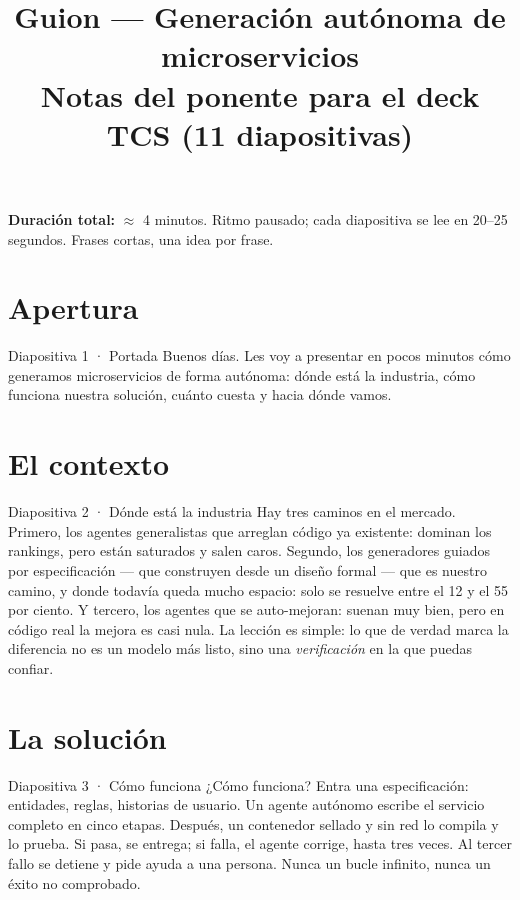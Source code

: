 \documentclass[11pt,a4paper]{article}
\title{\vspace{-1.2cm}\textbf{Guion — Generación autónoma de microservicios}\\[0.2cm]
\large Notas del ponente para el deck TCS (11 diapositivas)}
\author{}
\date{}
\begin{document}
\maketitle
\thispagestyle{fancy}

\begin{tcolorbox}[colback=bl!6,colframe=bl,arc=2pt,left=8pt,right=8pt,top=6pt,bottom=6pt]
\textbf{Duración total:} $\approx$ 4 minutos. Ritmo pausado; cada diapositiva se lee
en 20--25 segundos. Frases cortas, una idea por frase.
\end{tcolorbox}

\section*{Apertura}

\begin{slide}{Diapositiva 1 · Portada}
Buenos días. Les voy a presentar en pocos minutos cómo generamos microservicios de
forma autónoma: dónde está la industria, cómo funciona nuestra solución, cuánto
cuesta y hacia dónde vamos.
\end{slide}

\section*{El contexto}

\begin{slide}{Diapositiva 2 · Dónde está la industria}
Hay tres caminos en el mercado. Primero, los agentes generalistas que arreglan código
ya existente: dominan los rankings, pero están saturados y salen caros. Segundo, los
generadores guiados por especificación --- que construyen desde un diseño formal ---
que es nuestro camino, y donde todavía queda mucho espacio: solo se resuelve entre el
12 y el 55 por ciento. Y tercero, los agentes que se auto-mejoran: suenan muy bien,
pero en código real la mejora es casi nula. La lección es simple: lo que de verdad
marca la diferencia no es un modelo más listo, sino una \emph{verificación} en la que
puedas confiar.
\end{slide}

\section*{La solución}

\begin{slide}{Diapositiva 3 · Cómo funciona}
¿Cómo funciona? Entra una especificación: entidades, reglas, historias de usuario. Un
agente autónomo escribe el servicio completo en cinco etapas. Después, un contenedor
sellado y sin red lo compila y lo prueba. Si pasa, se entrega; si falla, el agente
corrige, hasta tres veces. Al tercer fallo se detiene y pide ayuda a una persona.
Nunca un bucle infinito, nunca un éxito no comprobado.
\end{slide}
\end{document}
